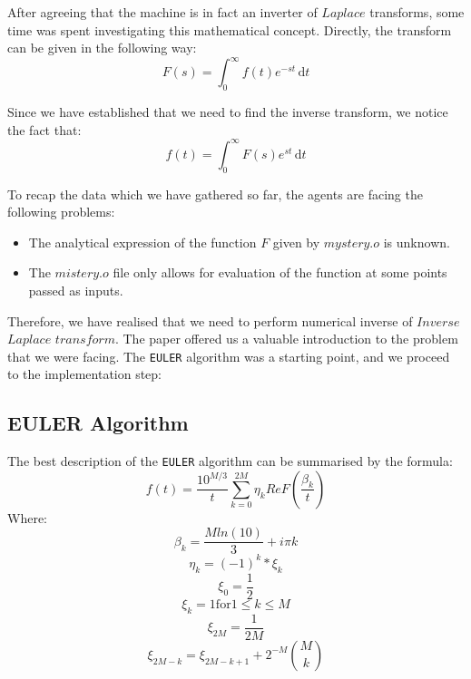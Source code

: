 After agreeing that the machine is in fact an inverter of $Laplace$ transforms, some time was spent investigating 
this mathematical concept. Directly, the transform can be given in the following way:
$$F(s) =\int_0^\infty \! f(t)e^{-st} \, \mathrm{d}t$$

Since we have established that we need to find the inverse transform, we notice the fact that:
$$f(t) =\int_0^\infty \! F(s)e^{st} \, \mathrm{d}t$$
\newline

To recap the data which we have gathered so far, the agents are facing the following problems:
\begin{itemize}
\item{The analytical expression of the function $F$ given by $mystery.o$ is unknown. }
\item{The $mistery.o$ file only allows for evaluation of the function at some points passed as inputs. }
\end{itemize}

Therefore, we have realised that we need to perform numerical inverse of $Inverse$ $Laplace$ $transform$.
The paper offered us a valuable introduction to the problem that we were facing.
The \texttt{EULER} algorithm was a starting point, and we proceed to the implementation step:

\subsection{EULER Algorithm}
The best description\cite{abate} of the \texttt{EULER} algorithm can be summarised by the formula:
$$f(t) = \frac{10^{M/3}}{t} \sum\limits_{k=0}^{2M} {\eta_k Re F(\frac{\beta_k}{t}) }$$
Where:
$$\beta_k = \frac{M ln(10)}{3} + i\pi k$$
$$\eta_k = (-1)^{k} *\xi_k$$
$$\xi_0 = \frac{1}{2}$$
$$\xi_k = 1 \text{for} 1 \leq k \leq M$$
$$\xi_{2M} = \frac{1}{2M}$$
$$\xi_{2M-k} = \xi_{2M-k+1}+2^{-M}\binom{M}{k}$$
\newline

